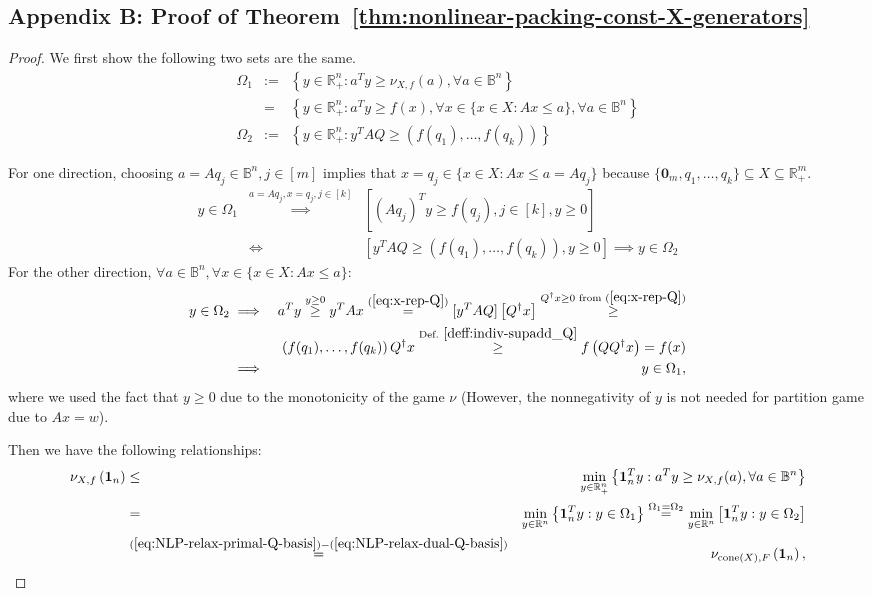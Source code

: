 \documentclass[11pt]{article}\usepackage[]{graphicx}\usepackage[]{xcolor}
\begin{document}
\subsection{Appendix B: Proof of Theorem~\ref{thm:nonlinear-packing-const-X-generators}}







\begin{proof}
We first show the following two sets are the same. 
\begin{eqnarray*}
\Omega_1&:=&\left\{y\in\mathbb{R}^n_{+}: a^Ty\ge \nu_{X, f}(a), \forall a\in\mathbb{B}^n\right\}\\
&=&\left\{y\in\mathbb{R}^n_{+}: a^Ty\ge f(x), \forall x\in \{x\in X: Ax\le a\}, \forall a\in \mathbb{B}^n\right\}\\
\Omega_2&:=&\left\{y\in\mathbb{R}^n_{+}: y^TAQ\ge (f(q_1),\dots, f(q_k))\right\}
\end{eqnarray*}

For one direction, choosing $a=Aq_j\in \mathbb{B}^n, j\in [m]$ implies that $x=q_j\in \{x\in X: Ax\le a=Aq_j\}$ because $\{\mathbf{0}_m, q_1,\dots, q_k\}\subseteq X\subseteq \mathbb{R}^m_{+}$.
\begin{eqnarray*}
y\in \Omega_1&\overset{a=Aq_j, x=q_j, j\in [k]}{\implies}& \left[ (Aq_j)^Ty\ge f(q_j), j\in [k], y\ge 0 \right]\\
&\iff& \left[y^TAQ\ge (f(q_1),\dots, f(q_k)), y\ge 0\right] \implies y\in \Omega_2
\end{eqnarray*}
For the other direction, $\forall a\in \mathbb{B}^n, \forall x\in \{x\in X: Ax\le a\}$:
\begin{eqnarray*}
y\in \Omega_2&\implies& a^Ty\overset{y\ge 0}{\ge} y^TAx\overset{(\ref{eq:x-rep-Q})}{=}
[y^TAQ]\left[Q^{\dagger}x\right]\overset{Q^{\dagger}x\ge 0 \text{ from } (\ref{eq:x-rep-Q}) }{\ge}\\ 
&&\left(f(q_1),\dots, f(q_k)\right)Q^{\dagger}x\overset{\text{Def.}~\ref{deff:indiv-supadd_Q}}{\ge}
f\left(QQ^{\dagger}x\right)=f(x)\\
&\implies& y\in \Omega_1,
\end{eqnarray*}
where we used the fact that $y\ge 0$ due to the monotonicity of the game $\nu$ (However, the nonnegativity of $y$ is not needed for partition game due to $Ax=w$). 

Then we have the following relationships:  
\begin{eqnarray*}
\nonumber \nu_{X, f}\left(\mathbf{1}_n\right)&\le &\min\limits_{y\in\mathbb{R}^{n}_{+}}\left\{\mathbf{1}_n^Ty: a^Ty\ge \nu_{X, f}(a), \forall a\in\mathbb{B}^n\right\}\\
\nonumber&=&\min\limits_{y\in\mathbb{R}^{n}}\left\{\mathbf{1}_n^Ty: y\in \Omega_1\right\}\overset{\Omega_1=\Omega_2}{=}\min\limits_{y\in\mathbb{R}^{n}} \left[\mathbf{1}_n^Ty: y\in \Omega_2\right]\\
\nonumber&\overset{(\ref{eq:NLP-relax-primal-Q-basis})-(\ref{eq:NLP-relax-dual-Q-basis})}{=}&\nu_{\text{cone}(X), F}\left(\mathbf{1}_n\right),
\end{eqnarray*}


\end{proof}
\end{document}
